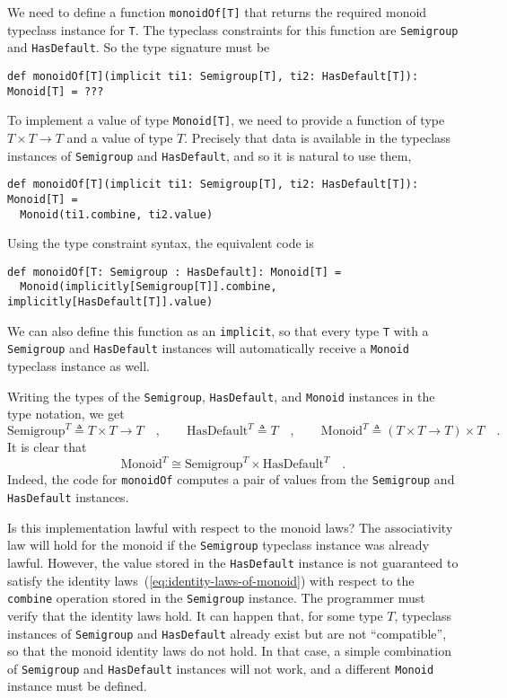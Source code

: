 We need to define a function \lstinline!monoidOf[T]! that returns
the required monoid typeclass instance for \lstinline!T!. The typeclass
constraints for this function are \lstinline!Semigroup! and \lstinline!HasDefault!.
So the type signature must be
\begin{lstlisting}
def monoidOf[T](implicit ti1: Semigroup[T], ti2: HasDefault[T]): Monoid[T] = ???
\end{lstlisting}
To implement a value of type \lstinline!Monoid[T]!, we need to provide
a function of type $T\times T\rightarrow T$ and a value of type $T$.
Precisely that data is available in the typeclass instances of \lstinline!Semigroup!
and \lstinline!HasDefault!, and so it is natural to use them,
\begin{lstlisting}
def monoidOf[T](implicit ti1: Semigroup[T], ti2: HasDefault[T]): Monoid[T] =
  Monoid(ti1.combine, ti2.value)
\end{lstlisting}
Using the type constraint syntax, the equivalent code is
\begin{lstlisting}
def monoidOf[T: Semigroup : HasDefault]: Monoid[T] =
  Monoid(implicitly[Semigroup[T]].combine, implicitly[HasDefault[T]].value)
\end{lstlisting}
We can also define this function as an \lstinline!implicit!, so that
every type \lstinline!T! with a \lstinline!Semigroup! and \lstinline!HasDefault!
instances will automatically receive a \lstinline!Monoid! typeclass
instance as well.

Writing the types of the \lstinline!Semigroup!, \lstinline!HasDefault!,
and \lstinline!Monoid! instances in the type notation, we get
\[
\text{Semigroup}^{T}\triangleq T\times T\rightarrow T\quad,\quad\quad\text{HasDefault}^{T}\triangleq T\quad,\quad\quad\text{Monoid}^{T}\triangleq\left(T\times T\rightarrow T\right)\times T\quad.
\]
It is clear that
\[
\text{Monoid}^{T}\cong\text{Semigroup}^{T}\times\text{HasDefault}^{T}\quad.
\]
Indeed, the code for \lstinline!monoidOf! computes a pair of values
from the \lstinline!Semigroup! and \lstinline!HasDefault! instances. 

Is this implementation lawful with respect to the monoid laws? The
associativity law will hold for
the monoid if the \lstinline!Semigroup! typeclass instance was already
lawful. However, the value stored in the \lstinline!HasDefault! instance
is not guaranteed to satisfy the identity laws~(\ref{eq:identity-laws-of-monoid})
with respect to the \lstinline!combine! operation stored in the \lstinline!Semigroup!
instance. The programmer must verify that the identity laws hold.
It can happen that, for some type $T$, typeclass instances of \lstinline!Semigroup!
and \lstinline!HasDefault! already exist but are not \textsf{``}compatible\textsf{''},
so that the monoid identity laws do not hold. In that case, a simple
combination of \lstinline!Semigroup! and \lstinline!HasDefault!
instances will not work, and a different \lstinline!Monoid! instance
must be defined.

